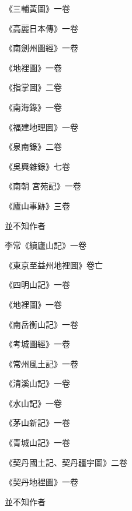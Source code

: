 \begin{pinyinscope}
 《三輔黃圖》一卷



 《高麗日本傳》一卷



 《南劍州圖經》一卷



 《地裡圖》一卷



 《指掌圖》二卷



 《南海錄》一卷



 《福建地理圖》一卷



 《泉南錄》二卷



 《吳興雜錄》七卷



 《南朝
 宮苑記》一卷



 《廬山事跡》三卷



 並不知作者



 李常《續廬山記》一卷



 《東京至益州地裡圖》卷亡



 《四明山記》一卷



 《地裡圖》一卷



 《南岳衡山記》一卷



 《考城圖經》一卷



 《常州風土記》一卷



 《清溪山記》一卷



 《水山記》一卷



 《茅山新記》一卷



 《青城山記》一卷



 《契丹國土記、契丹疆宇圖》二卷



 《契丹地裡圖》一卷



 並不知作者




\end{pinyinscope}
